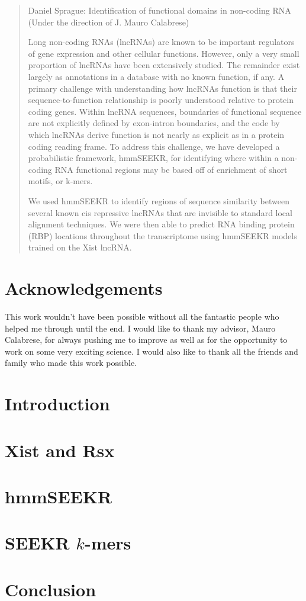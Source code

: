 \documentclass[11pt]{report}
\def\mainmatter{%
    \pagenumbering{arabic}
    \setcounter{page}{1}
    \setcounter{section}{0}
    \renewcommand{\thesection}{\arabic{section}}
}%
\begin{document}
\begin{abstract}
\thispagestyle{plain}
\begin{center}
Daniel Sprague: Identification of functional domains in non-coding RNA\\
(Under the direction of J. Mauro Calabrese)
\end{center}
Long non-coding RNAs (lncRNAs) are known to be important regulators of gene expression and other cellular functions. However, only a very small proportion of lncRNAs have been extensively studied. The remainder exist largely as annotations in a database with no known function, if any. A primary challenge with understanding how lncRNAs function is that their sequence-to-function relationship is poorly understood relative to protein coding genes. Within lncRNA sequences, boundaries of functional sequence are not explicitly defined by exon-intron boundaries, and the code by which lncRNAs derive function is not nearly as explicit as in a protein coding reading frame. To address this challenge, we have developed a probabilistic framework, hmmSEEKR, for identifying where within a non-coding RNA functional regions may be based off of enrichment of short motifs, or k-mers. 

We used hmmSEEKR to identify regions of sequence similarity between several known cis repressive lncRNAs that are invisible to standard local alignment techniques. We were then able to predict RNA binding protein (RBP) locations throughout the transcriptome using hmmSEEKR models trained on the Xist lncRNA.
\end{abstract}
\chapter*{\center Acknowledgements}
\begin{center}
This work wouldn't have been possible without all the fantastic people who helped me through until the end. I would like to thank my advisor, Mauro Calabrese, for always pushing me to improve as well as for the opportunity to work on some very exciting science. I would also like to thank all the friends and family who made this work possible. 
\end{center}
\tableofcontents
\listoffigures
\listoftables
\clearpage

\mainmatter

\chapter{Introduction}

\chapter{Xist and Rsx}

\chapter{hmmSEEKR}

\chapter{SEEKR $k$-mers}

\chapter{Conclusion}

\end{document}

